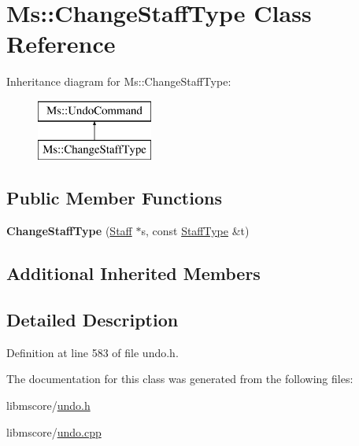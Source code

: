 \hypertarget{class_ms_1_1_change_staff_type}{}\section{Ms\+:\+:Change\+Staff\+Type Class Reference}
\label{class_ms_1_1_change_staff_type}
Inheritance diagram for Ms\+:\+:Change\+Staff\+Type\+:\begin{figure}[H]
\begin{center}
\leavevmode
\includegraphics[height=2.000000cm]{class_ms_1_1_change_staff_type}
\end{center}
\end{figure}
\subsection*{Public Member Functions}
\begin{DoxyCompactItemize}
\item 
\mbox{\label{class_ms_1_1_change_staff_type_a5f9a8e5b9d75cce0e8037aed6448653a}} 
{\bfseries Change\+Staff\+Type} (\hyperlink{class_ms_1_1_staff}{Staff} $\ast$s, const \hyperlink{class_ms_1_1_staff_type}{Staff\+Type} \&t)
\end{DoxyCompactItemize}
\subsection*{Additional Inherited Members}


\subsection{Detailed Description}


Definition at line 583 of file undo.\+h.



The documentation for this class was generated from the following files\+:\begin{DoxyCompactItemize}
\item 
libmscore/\hyperlink{undo_8h}{undo.\+h}\item 
libmscore/\hyperlink{undo_8cpp}{undo.\+cpp}\end{DoxyCompactItemize}

